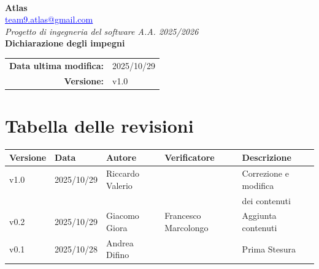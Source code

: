 \documentclass[a4paper,12pt]{article}
\makeatletter
\newcommand{\Gruppo}{Atlas}
\newcommand{\Email}{\href{mailto:team9.atlas@gmail.com}{\textcolor{blue}{\underline{team9.atlas@gmail.com}}}}
\newcommand{\TitoloUno}{Dichiarazione degli impegni}
\newcommand{\DataModifica}{2025/10/29}
\newcommand{\LogoGruppo}{img/AtlasLogo.png} %
\newcommand{\VersioneDocumento}{v1.0} %
\makeatother
\begin{document}
\begin{titlepage}
    \centering

    \vspace*{0cm}
    \\[0.8cm]

    {\LARGE \textbf{\Gruppo}}\\[0.1cm]
    {\large \Email}\\[1.2cm]

    {\Large \textit{Progetto di ingegneria del software A.A. 2025/2026}}\\[1.5cm]

    {\Huge \textbf{\TitoloUno}}\\[.5cm]

    \begin{tabular}{rl}
        \textbf{Data ultima modifica:} & \DataModifica \\
        \textbf{Versione:} & \VersioneDocumento \\
    \end{tabular}

\end{titlepage}


\section*{Tabella delle revisioni}
    \begin{center} 
        \begin{tabular}{|l|l|l|l|l|}
            \hline
            \textbf{Versione} & \textbf{Data} & \textbf{Autore} & \textbf{Verificatore} & \textbf{Descrizione} \\
            \hline
            v1.0 & 2025/10/29 & Riccardo Valerio & & Correzione e modifica\\
            &&&&dei contenuti\\
            \hline
            v0.2 & 2025/10/29 & Giacomo Giora & Francesco Marcolongo & Aggiunta contenuti \\
            \hline
            v0.1 & 2025/10/28 & Andrea Difino & & Prima Stesura \\
            \hline
        \end{tabular}
    \end{center}
\end{document}
